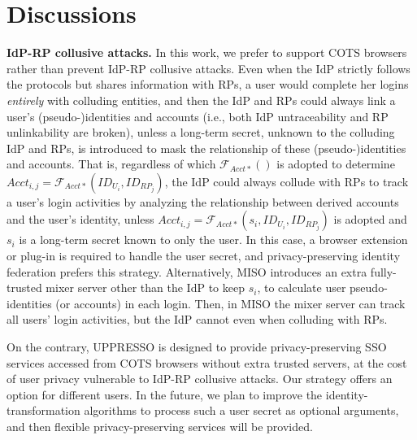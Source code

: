 \section{Discussions}
\label{sec:discussion}

\noindent \textbf{IdP-RP collusive attacks.} 
In this work, we prefer to support COTS browsers rather than prevent IdP-RP collusive attacks.
Even when the IdP strictly follows the protocols but shares information with RPs,
    a user would complete her logins \emph{entirely} with colluding entities,
    and then the IdP and RPs could always link a user's (pseudo-)identities and accounts (i.e., both IdP untraceability and RP unlinkability are broken),
    unless a long-term secret, unknown to the colluding IdP and RPs,
                is introduced to mask the relationship of these (pseudo-)identities and accounts.
That is, regardless of which $\mathcal{F}_{Acct\ast}()$ is adopted to determine
$Acct_{i,j} = \mathcal{F}_{Acct\ast}(ID_{U_i}, ID_{RP_j})$,
the IdP could always collude with RPs to track a user's login activities by analyzing the relationship between derived accounts and the user's identity,
unless $Acct_{i,j} = \mathcal{F}_{Acct\ast}(s_i,ID_{U_i}, ID_{RP_j})$ is adopted and $s_i$ is a long-term secret known to only the user.
In this case,
    a browser extension or plug-in is required
            to handle the user secret,
             and privacy-preserving identity federation \cite{ELPASSO, UnlimitID, idemix, PseudoID, uprov} prefers this strategy.
Alternatively, MISO \cite{miso} introduces an extra fully-trusted mixer server other than the IdP to keep $s_i$,
            to calculate user pseudo-identities (or accounts) in each login.
Then, in MISO the mixer server can track all users' login activities,
    but the IdP cannot even when colluding with RPs.

On the contrary,
    UPPRESSO is designed to provide privacy-preserving SSO services accessed from COTS browsers without extra trusted servers,
        at the cost of user privacy vulnerable to IdP-RP collusive attacks.
Our strategy offers an option for different users.
In the future, we plan to improve the identity-transformation algorithms
    to process such a user secret as optional arguments,
    and then flexible privacy-preserving services will be provided.


